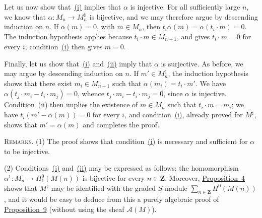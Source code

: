 \label{fac:III:3:no:67:proof:injectivity}
Let us now show that~\hyperref[fac:III:3:no:67:prop:9:item:i]{(i)} implies
that $\alpha$ is injective. For all sufficiently large $n$, we know that
$\alpha:M_n\longrightarrow M_n^\natural$ is bijective, and we may therefore
argue by descending induction on $n$. If $\alpha(m)=0$, with $m\in M_n$,
then
$t_i\alpha(m)=\alpha(t_i\cdot m)=0$. The induction hypothesis applies
because $t_i\cdot m\in M_{n+1}$, and gives $t_i\cdot m=0$ for every $i$;
condition~\hyperref[fac:III:3:no:67:prop:9:item:i]{(i)} then gives $m=0$.

\label{fac:III:3:no:67:proof:surjectivity}
Finally, let us show that~\hyperref[fac:III:3:no:67:prop:9:item:i]{(i)}
and~\hyperref[fac:III:3:no:67:prop:9:item:ii]{(ii)} imply that $\alpha$ is
surjective. As before, we may argue by descending induction on $n$. If
$m'\in M_n^\natural$, the induction hypothesis shows that there exist
$m_i\in M_{n+1}$ such that $\alpha(m_i)=t_i\cdot m'$. We have
$\alpha(t_j\cdot m_i-t_i\cdot m_j)=0$, whence
$t_j\cdot m_i-t_i\cdot m_j=0$, since $\alpha$ is injective.
Condition~\hyperref[fac:III:3:no:67:prop:9:item:ii]{(ii)} then implies the
existence of $m\in M_n$ such that $t_i\cdot m=m_i$; we have
$t_i(m'-\alpha(m))=0$ for every $i$, and
condition~\hyperref[fac:III:3:no:67:prop:9:item:i]{(i)}, already proved for
$M^\natural$, shows that $m'=\alpha(m)$ and completes the proof.

\label{fac:III:3:no:67:remark:1}
\textsc{Remarks.} (1) The proof shows that
condition~\hyperref[fac:III:3:no:67:prop:9:item:i]{(i)} is necessary and
sufficient for $\alpha$ to be injective.

\label{fac:III:3:no:67:remark:2}
(2) Conditions~\hyperref[fac:III:3:no:67:prop:9:item:i]{(i)}
and~\hyperref[fac:III:3:no:67:prop:9:item:ii]{(ii)} may be expressed as
follows:\hfill\break
{}\label{fac:III:3:no:67:formula:alpha1}the homomorphism
\mbox{$\alpha^1:M_n\longrightarrow H^0_1(M(n))$} is bijective for every
$n\in\mathbf{Z}$. Moreover,
\hyperref[fac:III:3:no:64:prop:4]{Proposition~4} shows that $M^\natural$ may
be identified with the graded $S$-module
\label{fac:III:3:no:67:formula:direct-sum}
$\sum_{n\in\mathbf{Z}}H^0(M(n))$, and it would be easy to deduce from this
a purely algebraic proof of
\hyperref[fac:III:3:no:67:prop:9]{Proposition~9} (without using the sheaf
$\mathcal{A}(M)$).
